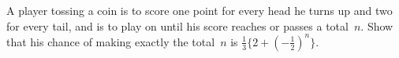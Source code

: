 A player tossing a coin is to score one point for every head he turns
up and two for every tail, and is to play on until his score reaches or passes
a total~$n$. Show that his chance of making exactly the total~$n$ is $\frac{1}{3}\{2 + (-\frac{1}{2})^{n}\}$. 

